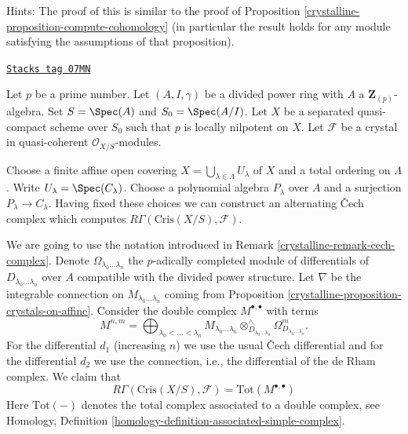 \begin{remark}
\medskip\noindent
Hints: The proof of this is similar to the proof of
Proposition \ref{crystalline-proposition-compute-cohomology} (in particular
the result holds for any module satisfying the assumptions of
that proposition).
\end{remark}

\begin{remark}

\label{crystalline-remark-alternating-cech-complex}
\href{https://stacks.math.columbia.edu/tag/07MN}{\texttt{Stacks tag 07MN}}

Let $p$ be a prime number. Let $(A, I, \gamma)$ be a divided power
ring with $A$ a $\mathbf{Z}_{(p)}$-algebra. Set $S = \Spec(A)$ and
$S_0 = \Spec(A/I)$. Let $X$ be a separated quasi-compact scheme
over $S_0$ such that $p$ is locally nilpotent on $X$. Let
$\mathcal{F}$ be a crystal in quasi-coherent $\mathcal{O}_{X/S}$-modules.

\medskip\noindent
Choose a finite affine open covering
$X = \bigcup_{\lambda \in \Lambda} U_\lambda$ of $X$
and a total ordering on $\Lambda$.
Write $U_\lambda = \Spec(C_\lambda)$. Choose a polynomial algebra
$P_\lambda$ over $A$ and a surjection $P_\lambda \to C_\lambda$.
Having fixed these choices we can construct an alternating
{\v C}ech complex which computes $R\Gamma(\text{Cris}(X/S), \mathcal{F})$.

\medskip\noindent
We are going to use the notation introduced in
Remark \ref{crystalline-remark-cech-complex}.
Denote $\Omega_{\lambda_0 \ldots \lambda_n}$
the $p$-adically completed module of differentials of
$D_{\lambda_0 \ldots \lambda_n}$ over $A$ compatible with the divided power
structure. Let $\nabla$ be the integrable connection on
$M_{\lambda_0 \ldots \lambda_n}$ coming from
Proposition \ref{crystalline-proposition-crystals-on-affine}.
Consider the double complex $M^{\bullet, \bullet}$ with
terms
$$
M^{n, m} =
\bigoplus\nolimits_{\lambda_0 < \ldots < \lambda_n}
M_{\lambda_0 \ldots \lambda_n}
\otimes^\wedge_{D_{\lambda_0 \ldots \lambda_n}}
\Omega^m_{D_{\lambda_0 \ldots \lambda_n}}.
$$
For the differential $d_1$ (increasing $n$) we use the usual
{\v C}ech differential and for the differential $d_2$ we use
the connection, i.e., the differential of the de Rham complex.
We claim that
$$
R\Gamma(\text{Cris}(X/S), \mathcal{F}) = \text{Tot}(M^{\bullet, \bullet})
$$
Here $\text{Tot}(-)$ denotes the total complex associated to a
double complex, see
Homology, Definition \ref{homology-definition-associated-simple-complex}.


\end{remark}
